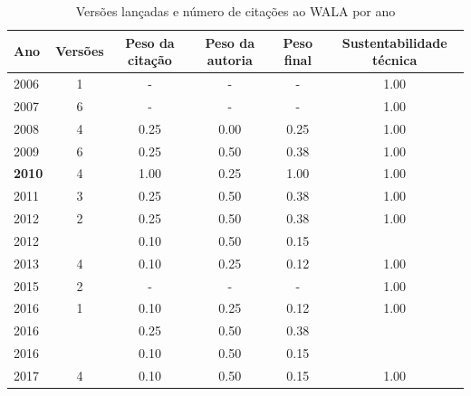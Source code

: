 \begin{table}[H]
\caption{Versões lançadas e número de citações ao WALA por ano}
\centering
\begin{tabular}{| l | c | c | c | c | c |}
  \hline
  Ano & Versões & Peso da citação & Peso da autoria & Peso final & Sustentabilidade técnica \\
  \hline
        2006 & 1 & - & - & -
        &
          {\color{blue} 1.00}
        \\
\hline
        2007 & 6 & - & - & -
        &
          {\color{blue} 1.00}
        \\
\hline
            2008
          &
          4
          &
          0.25
          &
          0.00
          &
          0.25
          &
            {\color{blue} 1.00}
          \\
\hline
            2009
          &
          6
          &
          0.25
          &
          0.50
          &
          0.38
          &
            {\color{blue} 1.00}
          \\
\hline
            {\bf 2010}
          &
          4
          &
          1.00
          &
          0.25
          &
          1.00
          &
            {\color{blue} 1.00}
          \\
\hline
            2011
          &
          3
          &
          0.25
          &
          0.50
          &
          0.38
          &
            {\color{blue} 1.00}
          \\
\hline
            2012
          &
          2
          &
          0.25
          &
          0.50
          &
          0.38
          &
            {\color{blue} 1.00}
          \\
            2012
          &
          
          &
          0.10
          &
          0.50
          &
          0.15
          &
          \\
\hline
            2013
          &
          4
          &
          0.10
          &
          0.25
          &
          0.12
          &
            {\color{blue} 1.00}
          \\
\hline
        2015 & 2 & - & - & -
        &
          {\color{blue} 1.00}
        \\
\hline
            2016
          &
          1
          &
          0.10
          &
          0.25
          &
          0.12
          &
            {\color{blue} 1.00}
          \\
            2016
          &
          
          &
          0.25
          &
          0.50
          &
          0.38
          &
          \\
            2016
          &
          
          &
          0.10
          &
          0.50
          &
          0.15
          &
          \\
\hline
            2017
          &
          4
          &
          0.10
          &
          0.50
          &
          0.15
          &
            {\color{blue} 1.00}
          \\
\hline
\end{tabular}
\end{table}

